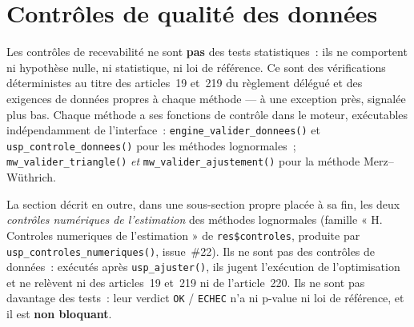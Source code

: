 \documentclass[a4paper,11pt]{article}
\newcommand{\code}[1]{\texttt{\small #1}}
\begin{document}
\clearpage
\section{Contrôles de qualité des données}
\label{sec:controles}

Les contrôles de recevabilité ne sont \textbf{pas} des tests statistiques~: ils ne
comportent ni hypothèse nulle, ni statistique, ni loi de référence. Ce sont des
vérifications déterministes au titre des articles~19 et~219 du règlement délégué
et des exigences de données propres à chaque méthode --- à une exception près,
signalée plus bas. Chaque méthode a ses
fonctions de contrôle dans le moteur, exécutables indépendamment de l'interface~:
\code{engine\_valider\_donnees()} et \code{usp\_controle\_donnees()} pour les
méthodes lognormales~; \code{mw\_valider\_triangle()} \emph{et}
\code{mw\_valider\_ajustement()} pour la méthode Merz--Wüthrich.

La section décrit en outre, dans une sous-section propre placée à sa fin, les deux
\emph{contrôles numériques de l'estimation} des méthodes lognormales (famille
« H. Controles numeriques de l'estimation » de \code{res\$controles}, produite par
\code{usp\_controles\_numeriques()}, issue~\#22). Ils ne sont pas des contrôles de
données~: exécutés après \code{usp\_ajuster()}, ils jugent l'exécution de
l'optimisation et ne relèvent ni des articles~19 et~219 ni de l'article~220. Ils ne
sont pas davantage des tests~: leur verdict \code{OK} / \code{ECHEC} n'a ni p-value ni
loi de référence, et il est \textbf{non bloquant}.
\end{document}
